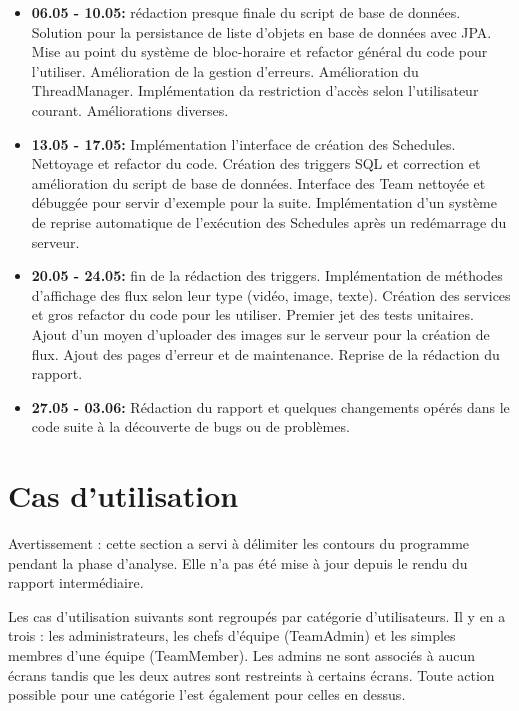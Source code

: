 \documentclass[french]{article}
\begin{document}
\begin{appendices}
\begin{itemize}
	\item \textbf{06.05 - 10.05:} rédaction presque finale du script de base de données. Solution pour la persistance de liste d'objets en base de données avec JPA. Mise au point du système de bloc-horaire et refactor général du code pour l'utiliser. Amélioration de la gestion d'erreurs. Amélioration du ThreadManager. Implémentation da restriction d'accès selon l'utilisateur courant. Améliorations diverses.
	\item \textbf{13.05 - 17.05:} Implémentation l'interface de création des Schedules. Nettoyage et refactor du code. Création des triggers SQL et correction et amélioration du script de base de données. Interface des Team nettoyée et débuggée pour servir d'exemple pour la suite. Implémentation d'un système de reprise automatique de l'exécution des Schedules après un redémarrage du serveur.
	\item \textbf{20.05 - 24.05:} fin de la rédaction des triggers. Implémentation de méthodes d'affichage des flux selon leur type (vidéo, image, texte). Création des services et gros refactor du code pour les utiliser. Premier jet des tests unitaires. Ajout d'un moyen d'uploader des images sur le serveur pour la création de flux. Ajout des pages d'erreur et de maintenance. Reprise de la rédaction du rapport.
	\item \textbf{27.05 - 03.06:} Rédaction du rapport et quelques changements opérés dans le code suite à la découverte de bugs ou de problèmes. 
\end{itemize}
 	
\newpage		
\section{Cas d'utilisation}

Avertissement : cette section a servi à délimiter les contours du programme pendant la phase d'analyse. Elle n'a pas été mise à jour depuis le rendu du rapport intermédiaire. \newline

Les cas d'utilisation suivants sont regroupés par catégorie d'utilisateurs. Il y en a trois : les administrateurs, les chefs d'équipe (TeamAdmin) et les simples membres d'une équipe (TeamMember). Les admins ne sont associés à aucun écrans tandis que les deux autres sont restreints à certains écrans.
Toute action possible pour une catégorie l'est également pour celles en dessus. 


\end{appendices}
\end{document}
